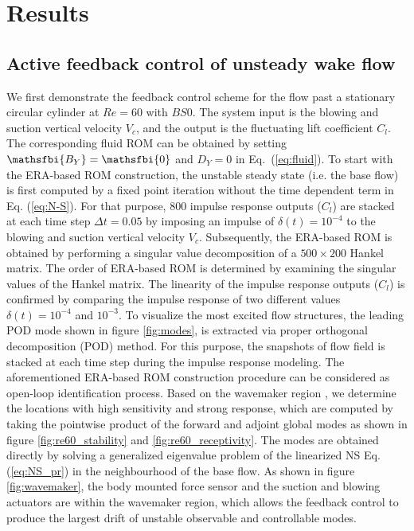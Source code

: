 \documentclass[standard]{jfm}
\begin{document}
\section{Results}\label{sec:results}
\subsection{Active feedback control of unsteady wake flow}\label{sec:stationary}
We first demonstrate the feedback control scheme for the  flow past a stationary circular cylinder at $Re=60$ with $BS0$. The system
input is the blowing and suction vertical velocity $V_c$, and the output is the fluctuating lift coefficient $C_l$. The corresponding 
fluid ROM can be obtained by setting $\mathsfbi{B_Y}=\mathsfbi{0}$ and $D_Y=0$ 
in Eq.~(\ref{eq:fluid}). 
%
To start with the ERA-based ROM construction, the unstable steady state (i.e. the base flow) is first computed by a fixed point iteration without the time dependent term in Eq. (\ref{eq:N-S}). 
For that purpose, 800 impulse response outputs ($C_l$) are stacked 
at each time step $\Delta t=0.05$ by imposing an impulse of $\delta(t)=10^{-4}$ 
to the blowing and suction vertical velocity $V_c$. 
Subsequently, the ERA-based ROM is obtained by performing a
singular value decomposition of a $500 \times 200$ Hankel matrix. 
The order of ERA-based ROM is determined by examining the singular values 
of the Hankel matrix.
The linearity of the impulse response outputs ($C_l$) is confirmed 
by comparing the impulse response of two different 
values $\delta(t)=10^{-4}$ and $10^{-3}$. To visualize the most excited flow structures, 
the leading POD mode shown in figure \ref{fig:modes}, is extracted via proper orthogonal decomposition (POD) method. For this purpose, the snapshots of flow field is stacked at
each time step during the impulse response modeling.
%
The aforementioned ERA-based ROM construction procedure can be considered as 
open-loop identification process.
%
Based on the wavemaker region \citep{Luchini2007}, we determine the locations 
with high sensitivity and strong response, which are computed by taking the pointwise 
product of the forward and adjoint global modes as shown in figure \ref{fig:re60_stability} and \ref{fig:re60_receptivity}. 
The modes are obtained directly by solving 
a generalized eigenvalue problem of the linearized NS Eq. (\ref{eq:NS_pr}) in the neighbourhood of the base flow. 
%
%
As shown in figure \ref{fig:wavemaker}, 
the body mounted force sensor and the suction and blowing actuators 
are within the wavemaker region, which allows the feedback control 
to produce the largest drift of unstable observable and controllable modes.
\end{document}
